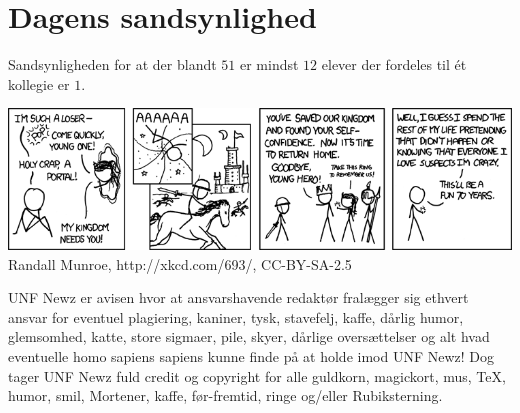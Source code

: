 \begin{minipage}[b]{0.95\linewidth}
\begin{minipage}[t]{0.47\textwidth}
\section*{Dagens sandsynlighed}
Sandsynligheden for at der blandt $51$ er mindst $12$ elever der fordeles til ét kollegie er $1$. 

\end{minipage}

\begin{center}
\includegraphics[width=\linewidth]{childrens_fantasy.png}
\tiny Randall Munroe, http://xkcd.com/693/, CC-BY-SA-2.5

\tiny UNF Newz er avisen hvor at ansvarshavende redaktør fralægger sig ethvert ansvar for eventuel plagiering, kaniner, tysk, stavefelj, kaffe, dårlig humor, glemsomhed, katte, store sigmaer, pile, skyer, dårlige oversættelser og alt hvad eventuelle homo sapiens sapiens kunne finde på at holde imod UNF Newz! Dog tager UNF Newz fuld credit og copyright for alle guldkorn, magickort, mus, \TeX, humor, smil, Mortener, kaffe, før-fremtid, ringe og/eller Rubiksterning.
\end{center}
\end{minipage}

